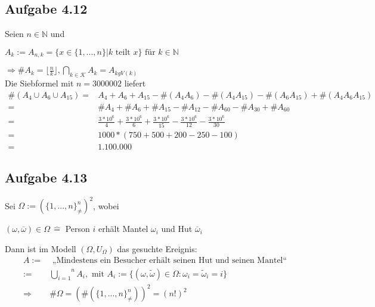\documentclass[10pt, a4paper]{article}
\begin{document}
\subsection{Aufgabe 4.12}
Seien $n\in\mathbb{N}$ und 
\begin{center}
	$A_{k}:= A_{n,k}=\{x\in\{1,...,n\}|k \text{ teilt }x\}\text{ für }k\in\mathbb{N}$	\\
\end{center}
$\Rightarrow\#A_{k}=\lfloor\frac{n}{k}\rfloor, \underset{k\in\mathcal{K}}{\bigcap}A_{k}=A_{kgV(k)}$	\\
Die Siebformel mit $n=3000002$ liefert
\begin{align*}
	\#(A_{4}\cup A_{6}\cup A_{15})=&A_{4}+A_{6}+A_{15}-\#(A_{4}A_{6})-\#(A_{4}A_{15})-\#(A_{6}A_{15})+\#(A_{4}A_{6}A_{15})	\\
	=& \#A_{4}+\#A_{6}+\#A_{15}-\#A_{12}-\#A_{60}-\#A_{30}+\#A_{60}	\\
	=& \frac{3*10^{6}}{4}+\frac{3*10^{6}}{6}+\frac{3*10^{6}}{15}-\frac{3*10^{6}}{12}-\frac{3*10^{6}}{30}	\\
	=& 1000*(750+500+200-250-100)	\\
	=&1.100.000
\end{align*}



\subsection{Aufgabe 4.13}
Sei $\Omega:=(\{1,...,n\}^{n}_{\neq})^{2}$, wobei
\begin{center}
	$(\omega, \overline{\omega})\in\Omega\hspace{2pt}\hat{=}$ Person $i$ erhält Mantel $\omega_{i}$ und Hut $\overline{\omega}_{i}$	\\
\end{center}
Dann ist im Modell $(\Omega, U_{\Omega})$ das gesuchte Ereignis:
\begin{align*}
	A:=&\text{ „Mindestens ein Besucher erhält seinen Hut und seinen Mantel“}	\\
	 :=& \stackrel{n}{\underset{i=1}{\bigcup}}A_{i},\text{ mit }A_{i}:=\{(\omega, \tilde{\omega})\in\Omega:\omega_{i}=\tilde{\omega}_{i}=i \}	\\
	 \Rightarrow&\#\Omega=(\#(\{1,...,n \}^{n}_{\neq}))^{2}=(n!)^{2}	 \\
\end{align*}
\end{document}
